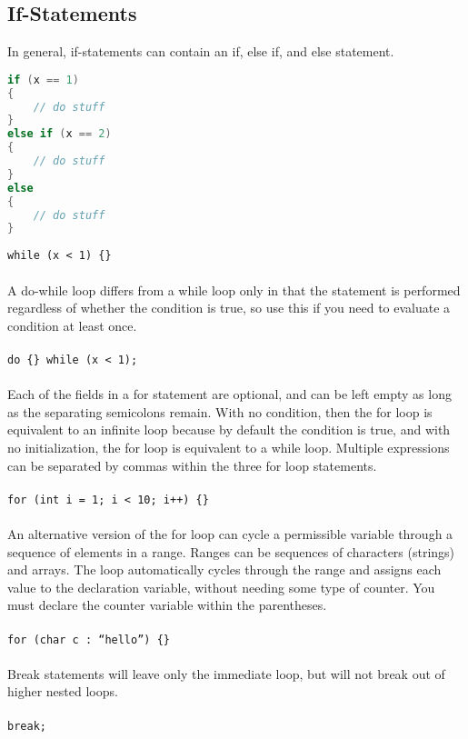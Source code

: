 \documentclass[10pt]{article}
\begin{document}
\subsection{If-Statements}

In general, if-statements can contain an if, else if, and else statement. 

\begin{lstlisting}[language=C++]
if (x == 1)
{
	// do stuff
}
else if (x == 2)
{
	// do stuff
}
else
{
	// do stuff
}
\end{lstlisting}

\color{red}\texttt{while (x < 1) \{\} }\color{black}\\
\\
A do-while loop differs from a while loop only in that the statement is performed regardless of whether the condition is true, so use this if you need to evaluate a condition at least once.\\
\\
\color{red}\texttt{do \{\} while (x < 1);}\color{black}\\
\\
Each of the fields in a for statement are optional, and can be left empty as long as the separating semicolons remain. With no condition, then the for loop is equivalent to an infinite loop because by default the condition is true, and with no initialization, the for loop is equivalent to a while loop. Multiple expressions can be separated by commas within the three for loop statements.\\
\\
\color{red}\texttt{for (int i = 1; i < 10; i++) \{\} }\color{black}\\
\\
An alternative version of the for loop can cycle a permissible variable through a sequence of elements in a range. Ranges can be sequences of characters (strings) and arrays. The loop automatically cycles through the range and assigns each value to the declaration variable, without needing some type of counter. You must declare the counter variable within the parentheses.\\
\\
\color{red}\texttt{for (char c : ``hello'') \{\} }\color{black}\\
\\
Break statements will leave only the immediate loop, but will not break out of higher nested loops.\\
\\
\color{red}\texttt{break;}\color{black}\\
\end{document}
